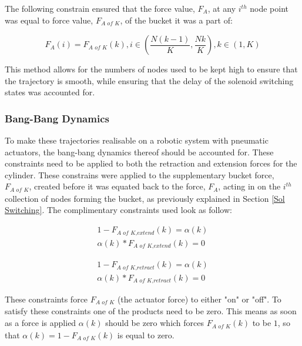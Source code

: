         The following constrain ensured that the force value, $F_A$, at any $i^{th}$ node point was equal to force value, $F_{\textit{A of K}}$, of the bucket it was a part of: 

        \begin{equation}
            F_A(i) = F_{\textit{A of K}}(k), i \in(\frac{N(k-1)}{K}, \frac{Nk}{K}), k \in(1, K)
        \end{equation}
        
        This method allows for the numbers of nodes used to be kept high to ensure that the trajectory is smooth, while ensuring that the delay of the solenoid switching states was accounted for.
        
        \subsubsection{Bang-Bang Dynamics} \label{Bang-Bang}
        To make these trajectories realisable on a robotic system with pneumatic actuators, the bang-bang dynamics thereof should be accounted for. These constraints need to be applied to both the retraction and extension forces for the cylinder. These constrains were applied to the supplementary bucket force, $F_{\textit{A of K}}$, created before it was equated back to the force, $F_A$, acting in on the $i^{th}$ collection of nodes forming the bucket, as previously explained in Section \ref{Sol Switching}. The complimentary constraints used look as follow:
        
        \begin{equation}
            \begin{split}
                1-F_{\textit{A of K,extend}}(k) = \alpha(k) \\
                \alpha(k) * F_{\textit{A of K,extend}}(k) = 0            
            \end{split}
        \end{equation}
        
        \begin{equation}
            \begin{split}
                1-F_{\textit{A of K,retract}}(k) = \alpha(k) \\
                \alpha(k) * F_{\textit{A of K,retract}}(k) = 0            
            \end{split}
        \end{equation}
        
        These constraints force $F_{\textit{A of K}}$ (the actuator force) to either "on" or "off". To satisfy these constraints one of the products need to be zero. This means as soon as a force is applied $\alpha(k)$ should be zero which forces $F_{\textit{A of K}}(k)$ to be $1$, so that $\alpha(k) = 1-F_{\textit{A of K}}(k)$ is equal to zero.
        

